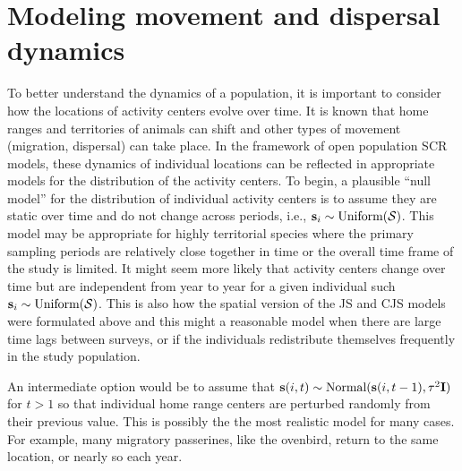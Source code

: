 \section{Modeling movement and dispersal dynamics}
\label{open.sec.ACdyanmics}

To better understand the dynamics of a population, it is important to consider 
how the locations of activity centers evolve over time. It is known that home ranges
and territories of animals can shift and other types of movement (migration, dispersal) 
can take place. In the framework of open population SCR models, these dynamics of 
individual locations can be reflected in appropriate models for the distribution of the activity centers.
To begin, a plausible ``null model'' for the
distribution of individual activity centers is to assume they are
static over time and do not change across periods,
i.e., ${\bf s}_{i} \sim \mbox{Uniform}({\cal S})$.  
This model may be appropriate for highly territorial species where the 
primary sampling periods are relatively close together in time or the overall 
time frame of the study is limited. 
It might seem more likely
that activity centers change over time but are independent from year to year for a
given individual such ${\bf s}_{i} \sim \mbox{Uniform}({\cal S})$.  This is also how
the spatial version of the JS and CJS models were formulated above and this might
a reasonable model when there are large time lags between surveys, or if the individuals redistribute themselves frequently
in the study population.

An intermediate option would be to assume that ${\bf s}(i,t) \sim
\mbox{Normal}({\bf s}(i,t-1), \tau^{2} {\bf I})$ for $t > 1$ so that
individual home range centers are perturbed randomly from their
previous value.  This is possibly the the most realistic model for
many cases.  For example, many migratory passerines, like the
ovenbird, return to the same location, or nearly so each year.


